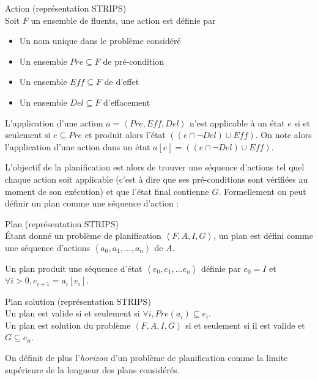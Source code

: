 \begin{definition}Action (représentation STRIPS)\\
	\label{def:action_strips}Soit $F$ un ensemble de fluents, une action est définie par
	\begin{itemize}
		\item Un nom unique dans le problème considéré
		\item Un ensemble $Pre \subseteq F$ de pré-condition
		\item Un ensemble $Eff \subseteq F$ de d'effet
		\item Un ensemble $Del \subseteq F$ d'effacement
	\end{itemize}
\end{definition}

L'application d'une action $a = \left<Pre, Eff, Del\right>$ n'est applicable à un état $e$ si et seulement si $e \subseteq Pre$ et produit alors l'état $((e \cap \neg Del) \cup Eff)$. On note alors l'application d'une action dans un état $a[e] = ((e \cap \neg Del) \cup Eff)$.

L'objectif de la planification est alors de trouver une séquence d'actions tel quel chaque action soit applicable (c'est à dire que ses pré-conditions sont vérifiées au moment de son exécution) et que l'état final contienne $G$. Formellement on peut définir un plan comme une séquence d'action :

\begin{definition}Plan (représentation STRIPS)\\
	\label{def:plan_strips}Étant donné un problème de planification $\left<F,A,I,G\right>$, un plan est défini comme une séquence d'actions $\left<a_0, a_1, ..., a_n \right>$ de $A$. 
\end{definition}

Un plan produit une séquence d'état $\left<e_0, e_1, ... e_n\right>$ définie par $e_0 = I$ et $\forall i > 0, e_{i+1} = a_i[e_i]$. 

\begin{definition}Plan solution (représentation STRIPS)\\
	\label{def:solution_strips}Un plan est valide si et seulement si $\forall i, Pre(a_i) \subseteq e_i$.\\	
	Un plan est solution du problème $\left<F,A,I,G\right>$ si et seulement si il est valide et $G \subseteq e_n$.
\end{definition}

On définit de plus l'\emph{horizon} d'un problème de planification comme la limite supérieure de la longueur des plans considérés.

